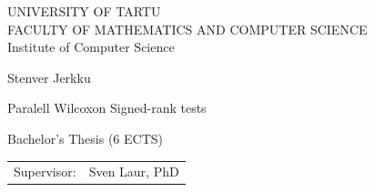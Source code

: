 \documentclass[12pt]{article}
\begin{document}
\thispagestyle{empty}
\begin{center}

\large
UNIVERSITY OF TARTU\\[2mm]
\uppercase{Faculty of Mathematics and Computer Science}\\[2mm]
Institute of Computer Science\\

\vspace{25mm}

\Large Stenver Jerkku

\vspace{4mm}

\huge Paralell Wilcoxon Signed-rank tests

\vspace{20mm}

\Large Bachelor's Thesis (6 ECTS)

\end{center}

\vspace{2mm}

\begin{flushright}
 {
 \setlength{\extrarowheight}{5pt}
 \begin{tabular}{r l}
  \sffamily Supervisor: & \sffamily Sven Laur, PhD
 \end{tabular}
 }
\end{flushright}

\vspace{10mm}

\vspace{2mm}



\vspace{2mm}


\vspace{8mm}
\end{document}
